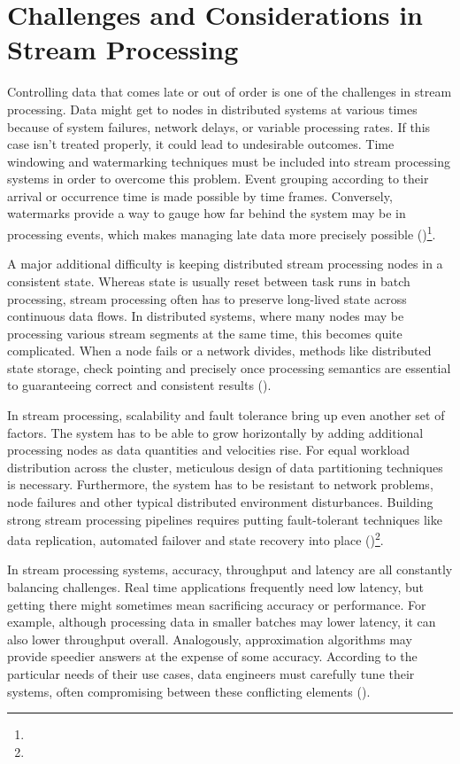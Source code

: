 \section{Challenges and Considerations in Stream Processing}

Controlling data that comes late or out of order is one of the challenges in stream processing. Data might get to nodes in distributed systems at various times because of system failures, network delays, or variable processing rates. If this case isn't treated properly, it could lead to undesirable outcomes. Time windowing and watermarking techniques must be included into stream processing systems in order to overcome this problem. Event grouping according to their arrival or occurrence time is made possible by time frames. Conversely, watermarks provide a way to gauge how far behind the system may be in processing events, which makes managing late data more precisely possible (\cite{ounacerRealtimeDataStream2017})\footnote[42]{}.

A major additional difficulty is keeping distributed stream processing nodes in a consistent state. Whereas state is usually reset between task runs in batch processing, stream processing often has to preserve long-lived state across continuous data flows. In distributed systems, where many nodes may be processing various stream segments at the same time, this becomes quite complicated. When a node fails or a network divides, methods like distributed state storage, check pointing and precisely once processing semantics are essential to guaranteeing correct and consistent results (\cite{fragkoulisSurveyEvolutionStream2023})\footnotemark[43].

In stream processing, scalability and fault tolerance bring up even another set of factors. The system has to be able to grow horizontally by adding additional processing nodes as data quantities and velocities rise. For equal workload distribution across the cluster, meticulous design of data partitioning techniques is necessary. Furthermore, the system has to be resistant to network problems, node failures and other typical distributed environment disturbances. Building strong stream processing pipelines requires putting fault-tolerant techniques like data replication, automated failover and state recovery into place (\cite{fragkoulisSurveyEvolutionStream2023})\footnote[43]{}.

In stream processing systems, accuracy, throughput and latency are all constantly balancing challenges. Real time applications frequently need low latency, but getting there might sometimes mean sacrificing accuracy or performance. For example, although processing data in smaller batches may lower latency, it can also lower throughput overall. Analogously, approximation algorithms may provide speedier answers at the expense of some accuracy. According to the particular needs of their use cases, data engineers must carefully tune their systems, often compromising between these conflicting elements (\cite{fragkoulisSurveyEvolutionStream2023})\footnotemark[43].

